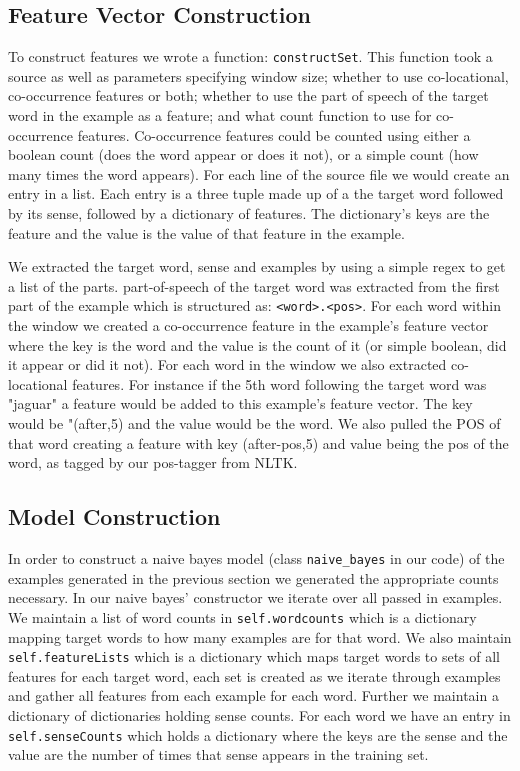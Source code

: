 \documentclass{article}
\begin{document}
\subsection{Feature Vector Construction}

To construct features we wrote a function: \texttt{constructSet}. This function took a source as well as parameters specifying window size; whether to use co-locational, co-occurrence features or both; whether to use the part of speech of the target word in the example as a feature; and what count function to use for co-occurrence features. Co-occurrence features could be counted using either a boolean count (does the word appear or does it not), or a simple count (how many times the word appears). For each line of the source file we would create an entry in a list. Each entry is a three tuple made up of a the target word followed by its sense, followed by a dictionary of features. The dictionary's keys are the feature and the value is the value of that feature in the example. 

We extracted the target word, sense and examples by using a simple regex to get a list of the parts. part-of-speech of the target word was extracted from the first part of the example which is structured as: \texttt{<word>.<pos>}. For each word within the window we created a co-occurrence feature in the example's feature vector where the key is the word and the value is the count of it (or simple boolean, did it appear or did it not). For each word in the window we also extracted co-locational features. For instance if the 5th word following the target word was "jaguar" a feature would be added to this example's feature vector. The key would be "(after,5) and the value would be the word. We also pulled the POS of that word creating a feature with key (after-pos,5) and value being the pos of the word, as tagged by our pos-tagger from NLTK.

\subsection{Model Construction}

In order to construct a naive bayes model (class \texttt{naive\_bayes} in our code) of the examples generated in the previous section we generated the appropriate counts necessary. In our naive bayes' constructor we iterate over all passed in examples. We maintain a list of word counts in \texttt{self.wordcounts} which is a dictionary mapping target words to how many examples are for that word. We also maintain \texttt{self.featureLists} which is a dictionary which maps target words to sets of all features for each target word, each set is created as we iterate through examples and gather all features from each example for each word. Further we maintain a dictionary of dictionaries holding sense counts. For each word we have an entry in \texttt{self.senseCounts} which holds a dictionary where the keys are the sense and the value are the number of times that sense appears in the training set. 
\end{document}
